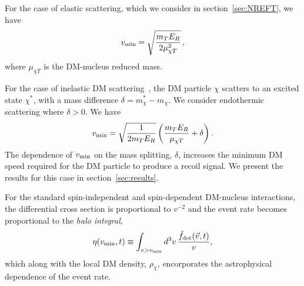 \documentclass[a4paper,11pt]{article}
\begin{document}
For the case of elastic scattering, which we consider in section~\ref{sec:NREFT}, we have
\begin{equation}
 v_{\rm min}=\sqrt{\frac{m_T E_R}{2\mu_{\chi T}^2}}\,,   
\end{equation}
where $\mu_{\chi T}$ is the DM-nucleus reduced mass. 

For the case of inelastic DM scattering~\cite{Tucker-Smith:2001myb}, the DM particle $\chi$ scatters to an excited state $\chi^\ast$, with a mass difference $\delta=m_\chi^\ast-m_\chi$. We consider endothermic scattering where $\delta>0$. We have
\begin{equation}
 v_{\rm min}=\sqrt{\frac{1}{2m_T E_R}}\left(\frac{m_T E_R}{\mu_{\chi T}}+\delta\right).
\label{eq:vmin_inel}
\end{equation}
The dependence of $v_{\rm{min}}$ on the mass splitting, $\delta$, increases the minimum DM speed required for the DM particle to produce a recoil signal. We present the results for this case in section~\ref{sec:results}.


For the standard spin-independent and spin-dependent DM-nucleus interactions, the differential cross section is proportional to $v^{-2}$ and the  event rate becomes proportional to the {\it halo integral},
\begin{equation}
    \eta(v_{\rm{min}},t) \equiv \int_{v > v_{\rm{min}}} d^3v \, \frac{\tilde{f}_{\rm{det}}({\vec v},t)}{v},
\label{eq:etavmin}
\end{equation}
which along with the local DM density, $\rho_\chi$, encorporates the astrophysical dependence of the event rate. 
\end{document}
